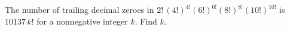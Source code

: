 The number of trailing decimal zeroes in $2!\,(4!)^{4!}(6!)^{6!}(8!)^{8!}(10!)^{10!}$ is $10137\,k!$ for a nonnegative integer $k$. Find $k$.
